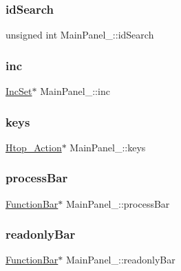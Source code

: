 \subsubsection{\texorpdfstring{id\+Search}{idSearch}}
{\footnotesize\ttfamily unsigned int Main\+Panel\+\_\+\+::id\+Search}

\mbox{\label{structMainPanel___a0d3a15ec76d5b45c310a1522ee099d70}} 
\subsubsection{\texorpdfstring{inc}{inc}}
{\footnotesize\ttfamily \hyperlink{IncSet_8h_a5a093913f0cffb0939e9000ae05e6604}{Inc\+Set}$\ast$ Main\+Panel\+\_\+\+::inc}

\mbox{\label{structMainPanel___a12e6da3f798e0a8d5975b8338c94e260}} 
\subsubsection{\texorpdfstring{keys}{keys}}
{\footnotesize\ttfamily \hyperlink{Action_8h_a1c7ea0d086ed493d839ab29d71b3d434}{Htop\+\_\+\+Action}$\ast$ Main\+Panel\+\_\+\+::keys}

\mbox{\label{structMainPanel___af8530a93d580a69f57935092371a405d}} 
\subsubsection{\texorpdfstring{process\+Bar}{processBar}}
{\footnotesize\ttfamily \hyperlink{FunctionBar_8h_acbf21c40af2139c165bafd8061c2ceda}{Function\+Bar}$\ast$ Main\+Panel\+\_\+\+::process\+Bar}

\mbox{\label{structMainPanel___a679693b5454c13c85d6a76c83474c6fa}} 
\subsubsection{\texorpdfstring{readonly\+Bar}{readonlyBar}}
{\footnotesize\ttfamily \hyperlink{FunctionBar_8h_acbf21c40af2139c165bafd8061c2ceda}{Function\+Bar}$\ast$ Main\+Panel\+\_\+\+::readonly\+Bar}

